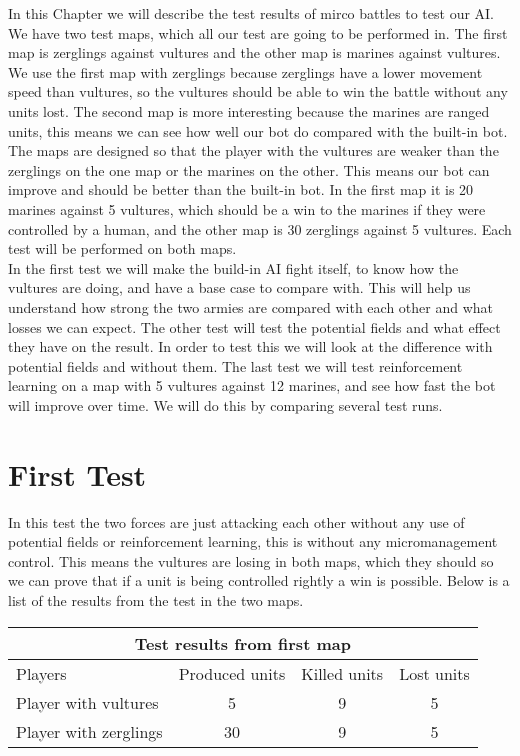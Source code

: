 In this Chapter we will describe the test results of mirco battles to test our AI. We have two test maps, which all our test are going to be performed in. The first map is  zerglings against vultures and the other map is marines against vultures. We use the first map with zerglings because zerglings have a lower movement speed than vultures, so the vultures should be able to win the battle without any units lost. The second map is more interesting because the marines are ranged units, this means we can see how well our bot do compared with the built-in bot. The maps are  designed so that the player with the vultures are weaker than the zerglings on the one map or the marines on the other. This means our bot can improve and should be better than the built-in bot. In the first map it is 20 marines against 5 vultures, which should be a win to the marines if they were controlled by a human, and the other map is 30 zerglings against 5 vultures. Each test will be performed on both maps. \\


In the first test we will make the build-in AI fight itself, to know how the vultures are doing, and have a base case to compare with. This will help us understand how strong the two armies are compared with each other and what losses we can expect. The other test will test the potential fields and what effect they have on the result.
In order to test this we will look at the difference with potential fields and without them. The last test we will test reinforcement learning on a map with 5 vultures against 12 marines, and see how fast the bot will improve over time. We will do this by comparing several test runs.

\section{First Test} %
In this test the two forces are just attacking each other without any use of potential fields or reinforcement learning, this is without any micromanagement control. This means the vultures are losing in both maps, which they should so we can prove that if a unit is being controlled rightly a win is possible. Below is a list of the results from the test in the two maps.\\

\begin{centering}
 \begin{tabular}{|l|c|c|c|}
	\multicolumn{4}{c}{Test results from first map} \\
	\hline
		Players & Produced units & Killed units & Lost units\\
	\hline
	\hline
		Player with vultures & 5 & 9 & 5 \\
	\hline
		Player with zerglings & 30 & 9 & 5\\
	\hline

\end{tabular}
\end{centering}
\newpage

